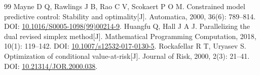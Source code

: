 \begin{thebibliography}{99}
Mayne D Q, Rawlings J B, Rao C V, Scokaert P O M.
Constrained model predictive control: Stability and optimality[J].
Automatica, 2000, 36(6): 789--814.
DOI: \href{https://doi.org/10.1016/S0005-1098(99)00214-9}{10.1016/S0005-1098(99)00214-9}.
Huangfu Q, Hall J A J. Parallelizing the dual revised simplex method[J].
Mathematical Programming Computation, 2018, 10(1): 119--142.
DOI: \href{https://doi.org/10.1007/s12532-017-0130-5}{10.1007/s12532-017-0130-5}.
Rockafellar R T, Uryasev S. Optimization of conditional value-at-risk[J].
Journal of Risk, 2000, 2(3): 21--41.
DOI: \href{https://doi.org/10.21314/JOR.2000.038}{10.21314/JOR.2000.038}.
\end{thebibliography}
